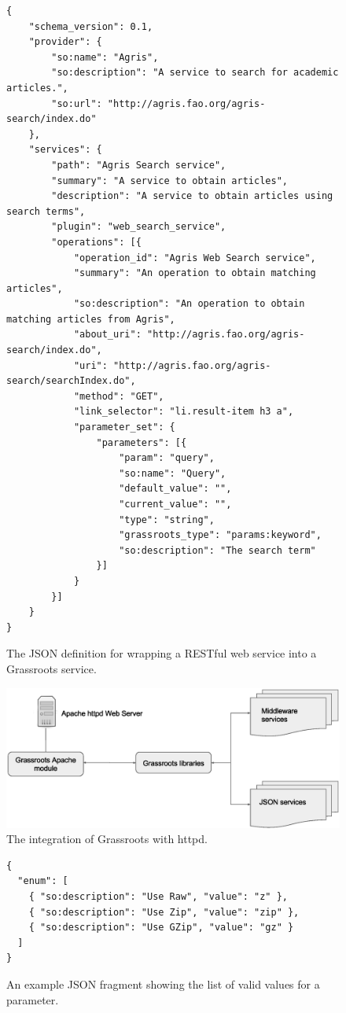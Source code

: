 \documentclass[9pt,a4paper]{extarticle}
\begin{document}
\begin{figure}[ht]
\centering
\begin{lstlisting}[style=json]
{
	"schema_version": 0.1,
	"provider": {
		"so:name": "Agris",
		"so:description": "A service to search for academic articles.",
		"so:url": "http://agris.fao.org/agris-search/index.do"
	},
	"services": {
		"path": "Agris Search service",
		"summary": "A service to obtain articles",
		"description": "A service to obtain articles using search terms",    
		"plugin": "web_search_service",
		"operations": [{
			"operation_id": "Agris Web Search service",
			"summary": "An operation to obtain matching articles",
			"so:description": "An operation to obtain matching articles from Agris",
			"about_uri": "http://agris.fao.org/agris-search/index.do",
			"uri": "http://agris.fao.org/agris-search/searchIndex.do",
			"method": "GET",
			"link_selector": "li.result-item h3 a",
			"parameter_set": {
				"parameters": [{
					"param": "query",
					"so:name": "Query",
					"default_value": "",
					"current_value": "",
					"type": "string",
					"grassroots_type": "params:keyword",
					"so:description": "The search term"
				}]
			}
		}]
	}
}
\end{lstlisting}
\caption{\label{fig:json_service}The JSON definition for wrapping a RESTful web service into a Grassroots service.}
\end{figure}

\begin{figure}[ht]
\centering
\includegraphics[width=\textwidth]{apache_grassroots}
\caption{\label{fig:httd_grassroots} The integration of Grassroots with httpd.}
\end{figure}


\begin{figure}[ht]
\centering
\begin{lstlisting}[style=json]
{
  "enum": [
    { "so:description": "Use Raw", "value": "z" },
    { "so:description": "Use Zip", "value": "zip" },
    { "so:description": "Use GZip", "value": "gz" }
  ]
}
\end{lstlisting}
\caption{\label{fig:parameter_enum}An example JSON fragment showing the list of valid values for a parameter.}
\end{figure}
\end{document}
